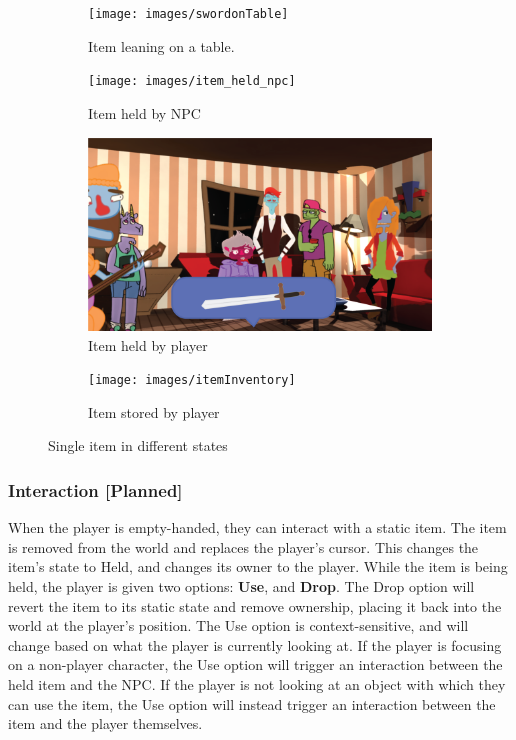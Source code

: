 \documentclass{GlobalDocument}
\begin{document}
\begin{figure}[htb]
  \begin{subfigure}{.24\textwidth}
    \centering
    \texttt{[image: images/swordonTable]}
    \caption{Item leaning on a table.}
  \end{subfigure}%
  \begin{subfigure}{.24\textwidth}
    \centering
    \texttt{[image: images/item\_held\_npc]}
    \caption{Item held by NPC}
  \end{subfigure}%
  \begin{subfigure}{.24\textwidth}
    \centering
    \includegraphics[width=.9\linewidth]{images/CharacterItem}
    \caption{Item held by player}
  \end{subfigure}%
  \begin{subfigure}{.24\textwidth}
    \centering
    \texttt{[image: images/itemInventory]}
    \caption{Item stored by player}
  \end{subfigure}%
  \caption{Single item in different states}
\end{figure}

\subsubsection{Interaction [Planned]}
\label{sec:item_interaction}
When the player is empty-handed, they can interact with a static item. The item is removed from the world and replaces the player's cursor. This changes the item's state to Held, and changes its owner to the player. While the item is being held, the player is given two options: \textbf{Use}, and \textbf{Drop}. The Drop option will revert the item to its static state and remove ownership, placing it back into the world at the player's position. The Use option is context-sensitive, and will change based on what the player is currently looking at. If the player is focusing on a non-player character, the Use option will trigger an interaction between the held item and the NPC. If the player is not looking at an object with which they can use the item, the Use option will instead trigger an interaction between the item and the player themselves.
\end{document}
